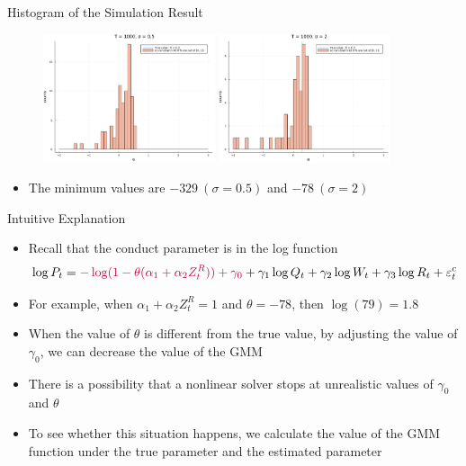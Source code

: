 \documentclass[aspectratio = 169]{beamer}
\theoremstyle{definition}
\begin{document}
\begin{frame}{Histogram of the Simulation Result}
    \begin{figure}[!htbp]
      \begin{center}
          {\includegraphics[width = 0.45\textwidth]
          {figuretable/histogram_loglinear_loglinear_n_1000_sigma_0.5_non_constraint.pdf}}
          {\includegraphics[width = 0.45\textwidth]
          {figuretable/histogram_loglinear_loglinear_n_1000_sigma_2_non_constraint.pdf}}
          \label{fg:histogram_loglinear_loglinear_no_constraint} 
        \end{center}
    \end{figure}
    \begin{itemize}
        \item The minimum values are $-329\ (\sigma = 0.5)$ and $-78\ (\sigma = 2)$
    \end{itemize}
\end{frame}



\begin{frame}{Intuitive Explanation}
    \begin{itemize}
        \item Recall that the conduct parameter is in the log function
            \begin{align*}
                \log P_t = \textcolor{purple}{- \log(1 - \theta(\alpha_1 + \alpha_2 Z^{R}_{t})) + \gamma_0} + \gamma_1 \log Q_t +  \gamma_2 \log W_{t} + \gamma_3 \log R_t + \varepsilon^{c}_{t}
            \end{align*}
        \item For example, when $\alpha_1 + \alpha_2 Z^{R}_{t} = 1$ and $\theta = - 78$, then $\log(79) = 1.8$
        \item When the value of $\theta$ is different from the true value, by adjusting the value of $\gamma_0$, we can decrease the value of the GMM
        \item There is a possibility that a nonlinear solver stops at unrealistic values of $\gamma_0$ and $\theta$
        \item To see whether this situation happens, we calculate the value of the GMM function under the true parameter and the estimated parameter
    \end{itemize}
\end{frame}
\end{document}

